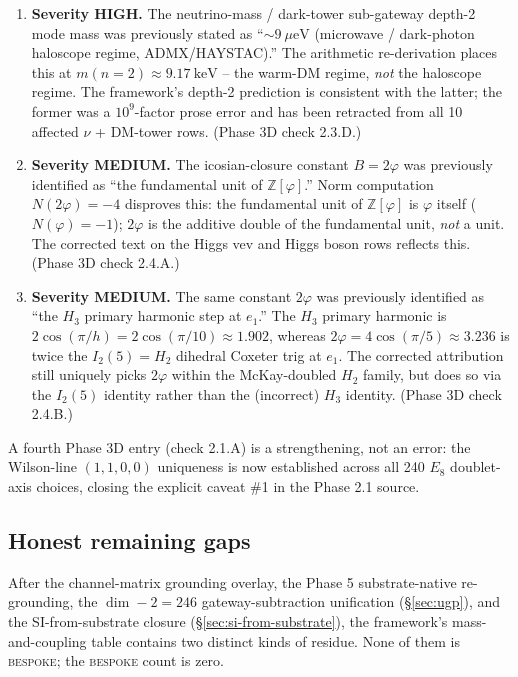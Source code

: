 ﻿\documentclass[reprint,amsmath,amssymb,aps,prd,longbibliography,floatfix]{revtex4-2}
\begin{document}
\begin{enumerate}
\item \textbf{Severity HIGH.} The neutrino-mass / dark-tower
sub-gateway depth-2 mode mass was previously stated as
``$\sim 9~\mu\mathrm{eV}$ (microwave / dark-photon haloscope regime,
ADMX/HAYSTAC).'' The arithmetic re-derivation places this at
$m(n=2) \approx 9.17~\mathrm{keV}$ -- the warm-DM regime, \emph{not}
the haloscope regime. The framework's depth-2 prediction is
consistent with the latter; the former was a $10^9$-factor prose
error and has been retracted from all 10 affected $\nu$ + DM-tower
rows. (Phase 3D check 2.3.D.)
\item \textbf{Severity MEDIUM.} The icosian-closure constant
$B = 2\varphi$ was previously identified as ``the fundamental unit of
$\mathbb{Z}[\varphi]$.'' Norm computation $N(2\varphi) = -4$ disproves
this: the fundamental unit of $\mathbb{Z}[\varphi]$ is $\varphi$
itself ($N(\varphi) = -1$); $2\varphi$ is the additive double of the
fundamental unit, \emph{not} a unit. The corrected text on the Higgs
vev and Higgs boson rows reflects this. (Phase 3D check 2.4.A.)
\item \textbf{Severity MEDIUM.} The same constant $2\varphi$ was
previously identified as ``the $H_3$ primary harmonic step at $e_1$.''
The $H_3$ primary harmonic is $2\cos(\pi/h) = 2\cos(\pi/10)
\approx 1.902$, whereas $2\varphi = 4\cos(\pi/5) \approx 3.236$ is
twice the $I_2(5) = H_2$ dihedral Coxeter trig at $e_1$. The
corrected attribution still uniquely picks $2\varphi$ within the
McKay-doubled $H_2$ family, but does so via the $I_2(5)$ identity
rather than the (incorrect) $H_3$ identity. (Phase 3D check 2.4.B.)
\end{enumerate}

A fourth Phase 3D entry (check 2.1.A) is a strengthening, not an
error: the Wilson-line $(1, 1, 0, 0)$ uniqueness is now established
across all 240 $E_8$ doublet-axis choices, closing the explicit
caveat \#1 in the Phase 2.1 source.

\subsection{Honest remaining gaps}
\label{sec:remaining-gaps}

After the channel-matrix grounding overlay, the Phase 5 substrate-native
re-grounding, the $\dim - 2 = 246$ gateway-subtraction unification
(\S\ref{sec:ugp}), and the SI-from-substrate closure
(\S\ref{sec:si-from-substrate}), the framework's mass-and-coupling
table contains two distinct kinds of residue. None of them is
\textsc{bespoke}; the \textsc{bespoke} count is zero.
\end{document}
